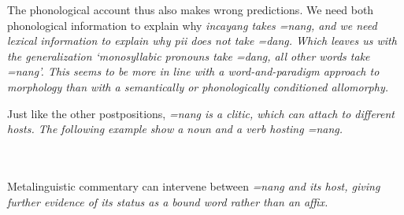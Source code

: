 
The phonological account thus also makes wrong predictions. We need both phonological information to explain why \em incayang \em takes \em =nang\em, and we need lexical information to explain why \em pii \em does not take \em =dang\em. Which leaves us with the generalization `monosyllabic pronouns take \em =dang\em, all other words take \em =nang\em'. This seems to be more in line with a word-and-paradigm approach to morphology \citep{Stump2001} than with a semantically or phonologically conditioned allomorphy.

Just like the other postpositions, \em =nang \em is a clitic, which can attach to different hosts. The following example show a noun  and a verb  hosting \em =nang\em.
 
 
\\  

\\ 

Metalinguistic commentary can intervene between \em =nang \em and its host, giving further evidence of its status as a bound word rather than an affix.


 \\
 


